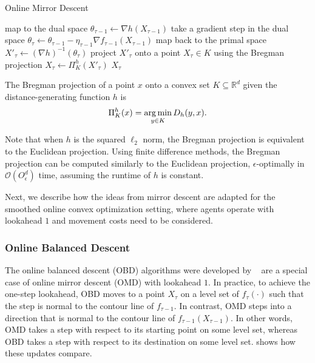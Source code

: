 \begin{algorithm}
    \caption{Online Mirror Descent~\cite{Gupta2020}}\label{alg:md:omd}
    map to the dual space $\theta_{\tau-1} \gets \nabla h (X_{\tau-1})$\;
    take a gradient step in the dual space $\theta_{\tau} \gets \theta_{\tau-1} - \eta_{\tau-1} \nabla f_{\tau-1}(X_{\tau-1})$\;
    map back to the primal space $X'_{\tau} \gets (\nabla h)^{-1}(\theta_{\tau})$\;
    project $X'_{\tau}$ onto a point $X_{\tau} \in K$ using the Bregman projection $X_{\tau} \gets \Pi_K^h(X'_{\tau})$\;
    \Return $X_{\tau}$\;
\end{algorithm}

\begin{definition}
\cite{Gupta2020} The Bregman projection of a point $x$ onto a convex set $K \subseteq \mathbb{R}^d$ given the distance-generating function $h$ is \begin{align*}
    \Pi_K^h(x) = \operatorname*{arg\,min}_{y \in K} D_h(y,x).
\end{align*}
\end{definition}

Note that when $h$ is the squared $\ell_2$ norm, the Bregman projection is equivalent to the Euclidean projection. Using finite difference methods, the Bregman projection can be computed similarly to the Euclidean projection, $\epsilon$-optimally in $\mathcal{O}(O_{\epsilon}^d)$ time, assuming the runtime of $h$ is constant.

Next, we describe how the ideas from mirror descent are adapted for the smoothed online convex optimization setting, where agents operate with lookahead $1$ and movement costs need to be considered.

\subsubsection{Online Balanced Descent}\label{section:online_algorithms:md:descent_methods:obd}

The online balanced descent (OBD) algorithms were developed by \citeauthor*{Chen2018}~\cite{Chen2018} are a special case of online mirror descent (OMD) with lookahead $1$. In practice, to achieve the one-step lookahead, OBD moves to a point $X_{\tau}$ on a level set of $f_{\tau}(\cdot)$ such that the step is normal to the contour line of $f_{\tau-1}$. In contrast, OMD steps into a direction that is normal to the contour line of $f_{\tau-1}(X_{\tau-1})$. In other words, OMD takes a step with respect to its starting point on some level set, whereas OBD takes a step with respect to its destination on some level set.  shows how these updates compare.

